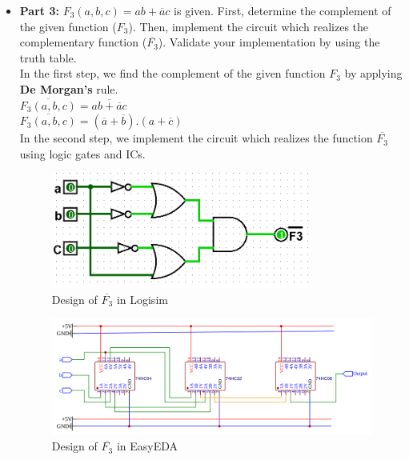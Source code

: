 \documentclass[pdftex,12pt,a4paper]{article}
\begin{document}
\begin{itemize}
    \item \textbf{Part 3:} $F_3 (a, b, c) = ab + \overline{a}c$ is given. First, determine the complement of the given function ($F_3$). Then, implement the circuit which realizes the complementary function ($\overline{F_3}$). Validate your implementation by using the truth table.\\

    In the first step, we find the complement of the given function $F_3$ by applying \textbf{De Morgan's} rule.\\
    
    $\overline{F_3 (a, b, c)} = \overline{ab + \overline{a}c}$ \\
    
    $\overline{F_3 (a, b, c)} = (\overline{a} + \overline{b}) . (a + \overline{c})$\\
    
    In the second step, we implement the circuit which realizes the function $\overline{F_3}$ using logic gates and ICs.\\

    \begin{figure}[H]
    \centering
        \includegraphics[width=0.8\textwidth]{F3comp.png}	
        \caption{Design of \textbf{$\overline{F_3}$} in Logisim}
   \end{figure}
   	
	\begin{figure}[H]
    \centering
        \includegraphics[width=\textwidth]{EasyEDA_part_3.png}	
        \caption{Design of \textbf{$\overline{F_3}$} in EasyEDA}        
	\end{figure}   
   

\end{itemize}
\end{document}
